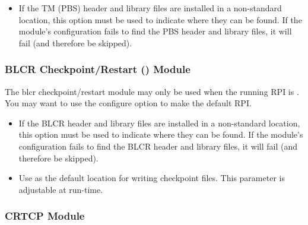 
\begin{itemize}

\item {}
  
  If the TM (PBS) header and library files are installed in a
  non-standard location, this option must be used to indicate where
  they can be found.  If the  module's configuration fails to
  find the PBS header and library files, it will fail (and therefore
  be skipped).

\end{itemize}



\subsubsection{BLCR Checkpoint/Restart () Module}
\label{sec:configure:ssi:options:blcr}

The blcr checkpoint/restart module may only be used when the running
RPI is .  You may want to use the configure option
 to make  the default RPI.


\begin{itemize}

\item {}
  
  If the BLCR header and library files are installed in a non-standard
  location, this option must be used to indicate where they can be
  found.  If the  module's configuration fails to find the
  BLCR header and library files, it will fail (and therefore be
  skipped).

\item {}

  Use  as the default location for writing checkpoint files.
  This parameter is adjustable at run-time.

\end{itemize}


\subsubsection{CRTCP  Module}

